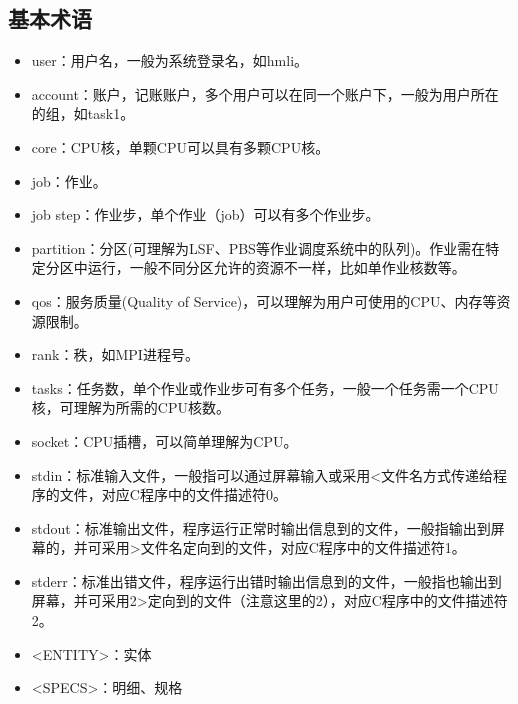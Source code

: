 \subsection{基本术语}
\begin{itemize}
	\item user：用户名，一般为系统登录名，如hmli。
	\item account：账户，记账账户，多个用户可以在同一个账户下，一般为用户所在的组，如task1。
	\item core：CPU核，单颗CPU可以具有多颗CPU核。
	\item job：作业。
	\item job step：作业步，单个作业（job）可以有多个作业步。
	\item partition：分区(可理解为LSF、PBS等作业调度系统中的队列)。作业需在特定分区中运行，一般不同分区允许的资源不一样，比如单作业核数等。
	\item qos：服务质量(Quality of Service)，可以理解为用户可使用的CPU、内存等资源限制。
	\item rank：秩，如MPI进程号。
	\item tasks：任务数，单个作业或作业步可有多个任务，一般一个任务需一个CPU核，可理解为所需的CPU核数。
	\item socket：CPU插槽，可以简单理解为CPU。
	\item stdin：标准输入文件，一般指可以通过屏幕输入或采用<文件名方式传递给程序的文件，对应C程序中的文件描述符0。
	\item stdout：标准输出文件，程序运行正常时输出信息到的文件，一般指输出到屏幕的，并可采用>文件名定向到的文件，对应C程序中的文件描述符1。
	\item stderr：标准出错文件，程序运行出错时输出信息到的文件，一般指也输出到屏幕，并可采用2>定向到的文件（注意这里的2），对应C程序中的文件描述符2。
	\item <ENTITY>：实体
	\item <SPECS>：明细、规格
\end{itemize}

